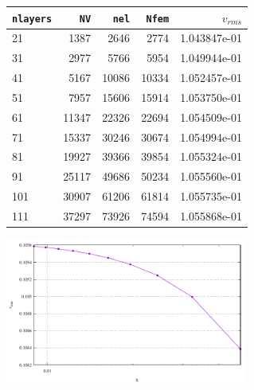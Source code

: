 \begin{center}
\begin{tabular}{lrrrr}
\hline
{\tt nlayers} & {\tt NV} & {\tt nel} & {\tt Nfem} & $v_{rms}$\\
\hline
\hline
21  &  1387 &  2646 &  2774 & 1.043847e-01\\ 
31  &  2977 &  5766 &  5954 & 1.049944e-01\\
41  &  5167 & 10086 & 10334 & 1.052457e-01\\
51  &  7957 & 15606 & 15914 & 1.053750e-01\\
61  & 11347 & 22326 & 22694 & 1.054509e-01\\
71  & 15337 & 30246 & 30674 & 1.054994e-01\\
81  & 19927 & 39366 & 39854 & 1.055324e-01\\
91  & 25117 & 49686 & 50234 & 1.055560e-01\\
101 & 30907 & 61206 & 61814 & 1.055735e-01\\
111 & 37297 & 73926 & 74594 & 1.055868e-01\\
\hline
\end{tabular}

\includegraphics[width=8cm]{python_codes/fieldstone_58/experiment1/vrms}
\end{center}


